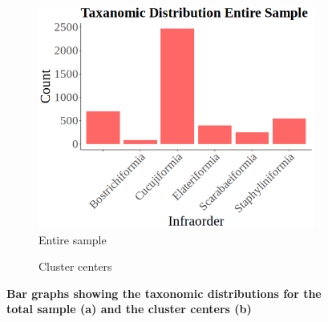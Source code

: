 \documentclass[12pt]{article}
\begin{document}
  \begin{figure}[H]
    \centering
    \begin{subfigure}{0.49\textwidth}
      \includegraphics[width=\linewidth]{Site100_total.png}
      \caption{Entire sample}
    \end{subfigure}
    \hspace{-0.3cm} 
    \begin{subfigure}{0.51\textwidth}
        \caption{Cluster centers}
    \end{subfigure}
    \captionsetup{margin=0.75cm}
      \caption{\textbf{\small Bar graphs showing the taxonomic distributions for the total sample (a) and the cluster centers (b)}}
  \end{figure}
\end{document}
